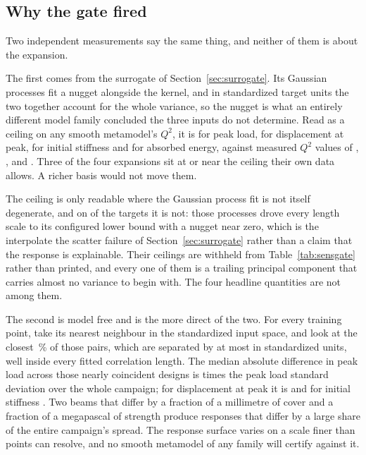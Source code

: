 \documentclass[11pt,a4paper]{article}
\begin{document}
\subsection{Why the gate fired}
\label{sec:sensdiagnosis}
Two independent measurements say the same thing, and neither of them is about the expansion.

The first comes from the surrogate of Section~\ref{sec:surrogate}. Its Gaussian processes fit a
nugget alongside the kernel, and in standardized target units the two together account for the
whole variance, so the nugget is what an entirely different model family concluded the three
inputs do not determine. Read as a ceiling on any smooth metamodel's $Q^2$, it is
\SensCeilingPMax{} for peak load, \SensCeilingUPeak{} for displacement at peak,
\SensCeilingKZero{} for initial stiffness and \SensCeilingEAbs{} for absorbed energy, against
measured $Q^2$ values of \SensQTwoPMax{}, \SensQTwoUPeak{}, \SensQTwoKZero{} and
\SensQTwoEAbs{}. Three of the four expansions sit at or near the ceiling their own data allows.
A richer basis would not move them.

The ceiling is only readable where the Gaussian process fit is not itself degenerate, and on
\SensPinned{} of the \SensTargets{} targets it is not: those processes drove every length scale
to its configured lower bound with a nugget near zero, which is the interpolate the scatter
failure of Section~\ref{sec:surrogate} rather than a claim that the response is explainable.
Their ceilings are withheld from Table~\ref{tab:sensgate} rather than printed, and every one of
them is a trailing principal component that carries almost no variance to begin with. The four
headline quantities are not among them.

The second is model free and is the more direct of the two. For every training point, take its
nearest neighbour in the standardized input space, and look at the closest
\SensRoughFraction\,\% of those pairs, which are separated by at most \SensRoughSeparation{} in
standardized units, well inside every fitted correlation length. The median absolute difference
in peak load across those nearly coincident designs is \SensRoughPMax{} times the peak load
standard deviation over the whole campaign; for displacement at peak it is \SensRoughUPeak{}
and for initial stiffness \SensRoughKZero{}. Two beams that differ by a fraction of a
millimetre of cover and a fraction of a megapascal of strength produce responses that differ by
a large share of the entire campaign's spread. The response surface varies on a scale finer
than \NValid{} points can resolve, and no smooth metamodel of any family will certify against
it.
\end{document}
